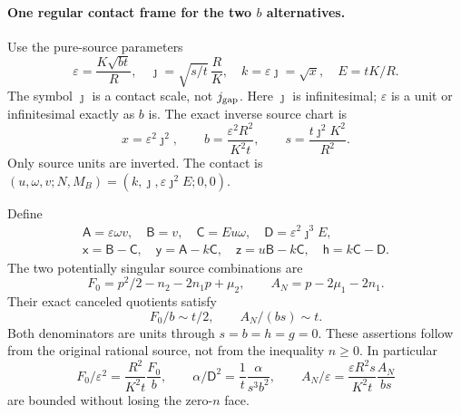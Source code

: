 \paragraph{One regular contact frame for the two $b$ alternatives.}
Use the pure-source parameters
\[
 \varepsilon=\frac{K\sqrt{bt}}R,\quad
 \jmath=\sqrt{s/t}\,\frac RK,\quad k=\varepsilon\jmath=\sqrt x,
 \quad E=tK/R.
 \tag{RU8}
\]
The symbol $\jmath$ is a contact scale, not $j_{\rm gap}$.
Here $\jmath$ is infinitesimal; $\varepsilon$ is a unit or
infinitesimal exactly as $b$ is. The exact inverse source chart is
\[
 x=\varepsilon^2\jmath^2,\qquad
 b=\frac{\varepsilon^2R^2}{K^2t},\qquad
 s=\frac{t\jmath^2K^2}{R^2}.
 \tag{RU9}
\]
Only source units are inverted. The contact is
$(u,\omega,v;N,M_B)=(k,\jmath,\varepsilon\jmath^2E;0,0)$.

Define
\[
\begin{gathered}
 \mathsf A=\varepsilon\omega v,\quad\mathsf B=v,
 \quad\mathsf C=Eu\omega,\quad\mathsf D=\varepsilon^2\jmath^3E,\\
 \mathsf x=\mathsf B-\mathsf C,\quad
 \mathsf y=\mathsf A-k\mathsf C,\quad
 \mathsf z=u\mathsf B-k\mathsf C,\quad
 \mathsf h=k\mathsf C-\mathsf D.
\end{gathered}                                                     \tag{RU10}
\]
The two potentially singular source combinations are
\[
 F_0=p^2/2-n_2-2n_1p+\mu_2,\qquad A_N=p-2\mu_1-2n_1.
\]
Their exact canceled quotients satisfy
\[
 F_0/b\sim t/2,\qquad A_N/(bs)\sim t.
 \tag{RU11}
\]
Both denominators are units through $s=b=h=g=0$. These assertions
follow from the original rational source, not from the inequality
$n\ge0$. In particular
\[
 F_0/\varepsilon^2=\frac{R^2}{K^2t}\frac{F_0}b,
 \qquad \alpha/\mathsf D^2=\frac1t\frac\alpha{s^3b^2},
 \qquad A_N/\varepsilon=\frac{\varepsilon R^2s}{K^2t}
                               \frac{A_N}{bs}
 \tag{RU12}
\]
are bounded without losing the zero-$n$ face.

